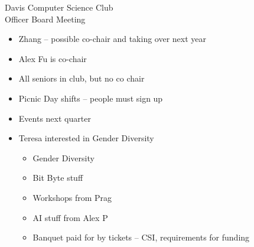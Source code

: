 \documentclass{article}
\begin{document}
\begin{Minutes}{Davis Computer Science Club\\Officer Board Meeting}
\begin {itemize}
    \item Zhang -- possible co-chair and taking over next year
\end {itemize}

\begin{itemize}
    \item Alex Fu is co-chair
\end {itemize}

\begin {itemize}
    \item All seniors in club, but no co chair
\end {itemize}

\begin{itemize}
    \item Picnic Day shifts -- people must sign up
    \item Events next quarter
    \item Teresa interested in Gender Diversity
    \begin{itemize}
        \item Gender Diversity
        \item Bit Byte stuff
        \item Workshops from Prag
        \item AI stuff from Alex P
        \item Banquet paid for by tickets -- CSI, requirements for funding
    \end{itemize}
\end {itemize}

\end{Minutes}
\thispagestyle{creditfooter}
\end{document}
